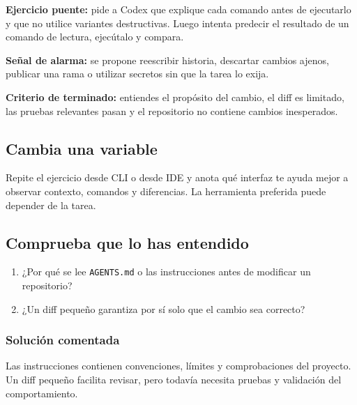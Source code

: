 \documentclass[10pt,a4paper,openany]{book}
\providecommand{\tightlist}{\setlength{\itemsep}{0.18em}\setlength{\parskip}{0pt}}
\begin{document}
\textbf{Ejercicio puente:} pide a Codex que explique cada comando antes
de ejecutarlo y que no utilice variantes destructivas. Luego intenta
predecir el resultado de un comando de lectura, ejecútalo y compara.

\begin{warningbox}

\textbf{Señal de alarma:} se propone reescribir historia, descartar
cambios ajenos, publicar una rama o utilizar secretos sin que la tarea
lo exija.

\end{warningbox}

\begin{successbox}

\textbf{Criterio de terminado:} entiendes el propósito del cambio, el
diff es limitado, las pruebas relevantes pasan y el repositorio no
contiene cambios inesperados.

\end{successbox}

\subsection{Cambia una variable}\label{cambia-una-variable-18}

Repite el ejercicio desde CLI o desde IDE y anota qué interfaz te ayuda
mejor a observar contexto, comandos y diferencias. La herramienta
preferida puede depender de la tarea.

\subsection{Comprueba que lo has
entendido}\label{comprueba-que-lo-has-entendido-18}

\begin{enumerate}
\def\labelenumi{\arabic{enumi}.}
\tightlist
\item
  ¿Por qué se lee \texttt{AGENTS.md} o las instrucciones antes de
  modificar un repositorio?
\item
  ¿Un diff pequeño garantiza por sí solo que el cambio sea correcto?
\end{enumerate}

\subsubsection{Solución comentada}\label{soluciuxf3n-comentada-20}

Las instrucciones contienen convenciones, límites y comprobaciones del
proyecto. Un diff pequeño facilita revisar, pero todavía necesita
pruebas y validación del comportamiento.
\end{document}
